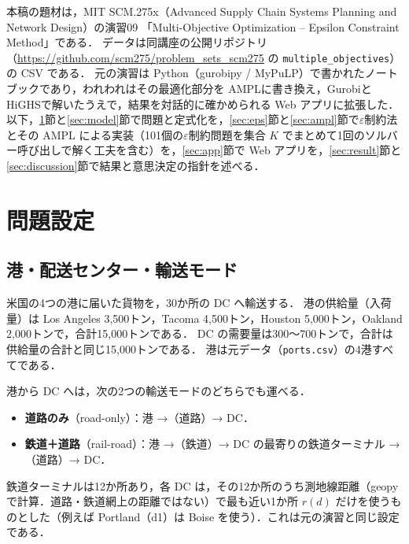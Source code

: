 \documentclass[a4paper,11pt]{ltjsarticle}
\begin{document}
本稿の題材は，MIT SCM.275x（Advanced Supply Chain Systems Planning and Network Design）の演習09
「Multi-Objective Optimization -- Epsilon Constraint Method」である．
データは同講座の公開リポジトリ（\url{https://github.com/scm275/problem_sets_scm275} の \texttt{multiple\_objectives}）の CSV である．
元の演習は Python（gurobipy / MyPuLP）で書かれたノートブックであり，われわれはその最適化部分を AMPL\cite{ampl}に書き換え，Gurobi\cite{gurobi}と HiGHS\cite{highs}で解いたうえで，結果を対話的に確かめられる Web アプリに拡張した．
以下，\ref{sec:problem}節と\ref{sec:model}節で問題と定式化を，\ref{sec:eps}節と\ref{sec:ampl}節で$\varepsilon$制約法とその AMPL による実装（101個の$\varepsilon$制約問題を集合 $K$ でまとめて1回のソルバー呼び出しで解く工夫を含む）を，\ref{sec:app}節で Web アプリを，\ref{sec:result}節と\ref{sec:discussion}節で結果と意思決定の指針を述べる．

\section{問題設定}\label{sec:problem}
\subsection{港・配送センター・輸送モード}
米国の4つの港に届いた貨物を，30か所の DC へ輸送する．
港の供給量（入荷量）は Los Angeles 3,500トン，Tacoma 4,500トン，Houston 5,000トン，Oakland 2,000トンで，合計15,000トンである．
DC の需要量は300〜700トンで，合計は供給量の合計と同じ15,000トンである．
港は元データ（\texttt{ports.csv}）の4港すべてである．

港から DC へは，次の2つの輸送モードのどちらでも運べる．
\begin{itemize}
  \item \textbf{道路のみ}（road-only）：港 →（道路）→ DC．
  \item \textbf{鉄道＋道路}（rail-road）：港 →（鉄道）→ DC の最寄りの鉄道ターミナル →（道路）→ DC．
\end{itemize}
鉄道ターミナルは12か所あり，各 DC は，その12か所のうち測地線距離（geopy で計算．道路・鉄道網上の距離ではない）で最も近い1か所 $r(d)$ だけを使うものとした（例えば Portland（d1）は Boise を使う）．これは元の演習と同じ設定である．
\end{document}
